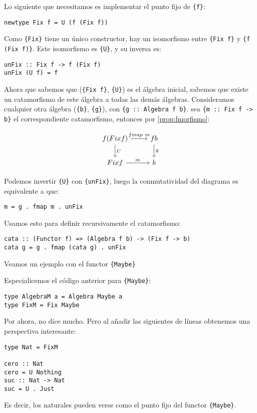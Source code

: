 \documentclass[12pt, twoside]{book}
\newcommand{\code}[1]{\Verb+{#1}+}
\begin{document}
Lo siguiente que necesitamos es implementar el punto fijo de \code{f}:
\begin{verbatim}
newtype Fix f = U (f (Fix f))
\end{verbatim}
Como \code{Fix} tiene un único constructor, hay un isomorfismo entre \code{Fix f} y \code{f (Fix f)}.
Este isomorfismo es \code{U}, y su inversa es:
\begin{verbatim}
unFix :: Fix f -> f (Fix f)
unFix (U f) = f
\end{verbatim}

Ahora que sabemos que (\code{Fix f}, \code{U}) es el álgebra inicial, sabemos que existe un catamorfismo de este álgebra a todas las demás álgebras.
Consideramos cualquier otra álgebra (\code{b}, \code{g}), con \code{g :: Algebra f b}. sea \code{m :: Fix f -> b} el correspondiente catamorfismo, entonces por \ref{prop:fmorfismo}:

\[
\begin{tikzcd}
{f (Fix f)} \arrow[r,"fmap\ m"] \arrow[d,"U"] & f b \arrow[d,"g"]\\
{Fix f} \arrow[r,"m"] & b
\end{tikzcd}
\]

Podemos invertir \code{U} con \code{unFix}, luego la conmutatividad del diagrama es equivalente a que:
\begin{verbatim}
m = g . fmap m . unFix
\end{verbatim}
Usamos esto para definir recursivamente el catamorfismo:
\begin{verbatim}
cata :: (Functor f) => (Algebra f b) -> (Fix f -> b)
cata g = g . fmap (cata g) . unFix
\end{verbatim}

Veamos un ejemplo con el functor \code{Maybe}
\begin{example}
Especialicemos el código anterior para \code{Maybe}:
\begin{verbatim}
type AlgebraM a = Algebra Maybe a
type FixM = Fix Maybe
\end{verbatim}
Por ahora, no dice mucho. Pero al añadir las siguientes de líneas obtenemos una perspectiva interesante:
\begin{verbatim}
type Nat = FixM

cero :: Nat
cero = U Nothing
suc :: Nat -> Nat
suc = U . Just
\end{verbatim}
Es decir, los naturales pueden verse como el punto fijo del functor \code{Maybe}.
\end{example}
\end{document}
